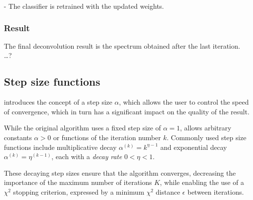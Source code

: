 - The classifier is retrained with the updated weights.

\subsubsection{Result}
The final deconvolution result is the spectrum obtained after the last iteration.
…?


\subsection{Step size functions} \label{sec:dsea:dsea:stepsize}
\dseaplus{} introduces the concept of a step size $\alpha$,
which allows the user to control the speed of convergence,
which in turn has a significant impact on the quality of the result.

While the original \dsea{} algorithm uses a fixed step size of $\alpha = 1$,
\dseaplus{} allows arbitrary constants $\alpha > 0$
or functions of the iteration number $k$.
Commonly used step size functions include
multiplicative decay
  $\alpha^{(k)} = k^{\eta - 1}$
and exponential decay
  $\alpha^{(k)} = \eta^{(k - 1)}$,
each with a \emph{decay rate} $0 < \eta < 1$.

These decaying step sizes ensure that the algorithm converges,
decreasing the importance of the maximum number of iterations $K$,
while enabling the use of a $\chi^2$ stopping criterion,
  expressed by a minimum $\chi^2$ distance $\epsilon$ between iterations.


